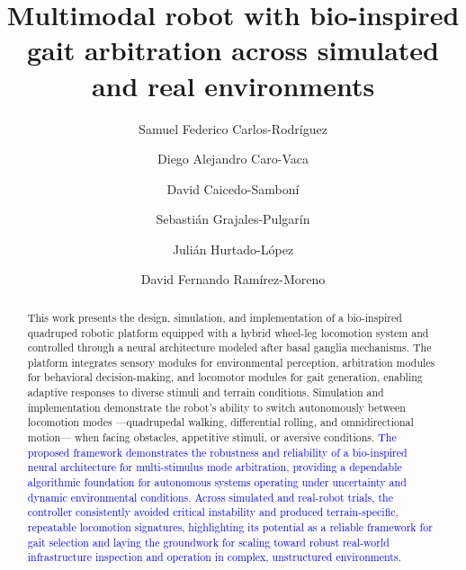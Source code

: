 \documentclass[preprint,12pt]{elsarticle}
\newcommand{\revblue}[1]{\textcolor{blue}{#1}}
\begin{document}
\begin{frontmatter}

\title{Multimodal robot with bio-inspired gait arbitration across simulated and real environments} %

\author{Samuel Federico Carlos-Rodríguez}
\author{Diego Alejandro Caro-Vaca}
\author{David Caicedo-Samboní}
\author{Sebastián Grajales-Pulgarín}
\author{Julián Hurtado-López}
\author{David Fernando Ramírez-Moreno}



\begin{abstract}
This work presents the design, simulation, and implementation of a bio-inspired quadruped robotic platform equipped with a hybrid wheel-leg locomotion system and controlled through a neural architecture modeled after basal ganglia mechanisms. The platform integrates sensory modules for environmental perception, arbitration modules for behavioral decision-making, and locomotor modules for gait generation, enabling adaptive responses to diverse stimuli and terrain conditions. Simulation and implementation demonstrate the robot's ability to switch autonomously between locomotion modes ---quadrupedal walking, differential rolling, and omnidirectional motion--- when facing obstacles, appetitive stimuli, or aversive conditions. \revblue{The proposed framework demonstrates the robustness and reliability of a bio-inspired neural architecture for multi-stimulus mode arbitration, providing a dependable algorithmic foundation for autonomous systems operating under uncertainty and dynamic environmental conditions. Across simulated and real-robot trials, the controller consistently avoided critical instability and produced terrain-specific, repeatable locomotion signatures, highlighting its potential as a reliable framework for gait selection and laying the groundwork for scaling toward robust real-world infrastructure inspection and operation in complex, unstructured environments.}
\end{abstract}


\end{frontmatter}
\end{document}
